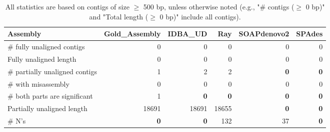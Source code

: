 \documentclass[12pt,a4paper]{article}
\begin{document}
\begin{table}[ht]
\begin{center}
\caption{All statistics are based on contigs of size $\geq$ 500 bp, unless otherwise noted (e.g., "\# contigs ($\geq$ 0 bp)" and "Total length ($\geq$ 0 bp)" include all contigs).}
\begin{tabular}{|l*{5}{|r}|}
\hline
Assembly & Gold\_Assembly & IDBA\_UD & Ray & SOAPdenovo2 & SPAdes \\ \hline
\# fully unaligned contigs & 0 & 0 & 0 & 0 & 0 \\ \hline
Fully unaligned length & 0 & 0 & 0 & 0 & 0 \\ \hline
\# partially unaligned contigs & 1 & 2 & 2 & {\bf 0} & {\bf 0} \\ \hline
\hspace{5mm}\# with misassembly & 0 & 0 & 0 & 0 & 0 \\ \hline
\hspace{5mm}\# both parts are significant & 1 & {\bf 0} & {\bf 0} & {\bf 0} & {\bf 0} \\ \hline
Partially unaligned length & 18691 & 18691 & 18655 & {\bf 0} & {\bf 0} \\ \hline
\# N's & {\bf 0} & {\bf 0} & 132 & 37 & {\bf 0} \\ \hline
\end{tabular}
\end{center}
\end{table}
\end{document}
